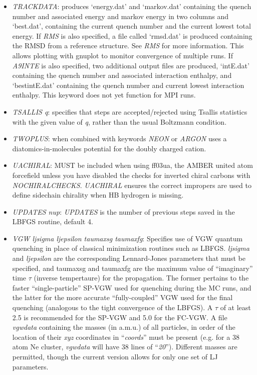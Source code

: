 \documentclass[12pt,a4paper,dvips]{article}
\begin{document}
\begin{itemize}
\item {\it TRACKDATA}: produces `energy.dat' and `markov.dat' containing the quench number and 
associated energy and markov energy in two columns and `best.dat', containing the current quench number and the current lowest
total energy. If {\it RMS\/} is also specified, a file called `rmsd.dat' is produced containing the RMSD from a reference structure.
See {\it RMS\/} for more information. This allows plotting with gnuplot to monitor convergence of multiple runs.
If {\it A9INTE} is also specified, two additional output files are produced, `intE.dat' containing the quench number and associated interaction
enthalpy, and `bestintE.dat' containing the quench number and current lowest interaction enthalpy. This keyword does not yet function for MPI runs.

\item {\it TSALLIS q\/}: specifies that steps are accepted/rejected using Tsallis statistics with the
given value of {\it q\/}, rather than the usual Boltzmann condition.

\item {\it TWOPLUS\/}: when combined with keywords {\it NEON\/} or {\it ARGON\/}
uses a diatomics-in-molecules potential for the doubly charged cation.

\item {\it UACHIRAL\/}: MUST be included when using ff03ua, the AMBER united atom forcefield unless you have disabled the checks for inverted chiral carbons
 with {\it NOCHIRALCHECKS\/}. {\it UACHIRAL\/} ensures the correct impropers are used to define sidechain chirality when HB hydrogen is missing. 

\item {\it UPDATES nup\/}: {\it UPDATES\/} is the number of previous steps saved in the LBFGS routine,
default 4.

\item {\it VGW ljsigma ljepsilon taumaxsg taumaxfg}: Specifies use of VGW quantum quenching in place of
classical minimization routines such as LBFGS. {\it ljsigma} and {\it ljepsilon} are the corresponding Lennard-Jones
parameters that must be specified, and taumaxsg and taumaxfg are the maximum value of ``imaginary'' time $\tau$ (inverse tempertaure) for the propagation.
The former pertains to the faster ``single-particle'' SP-VGW used for quenching during the MC runs, and the latter for the more accurate
``fully-coupled'' VGW used for the final quenching (analogous to the tight convergence of the LBFGS). A $\tau$ of at least
2.5 is recommended for the SP-VGW and 5.0 for the FC-VGW. A file {\it vgwdata} containing the masses (in a.m.u.) of all particles, in order of the location
of their {\it xyz} coordinates in ``{\it coords}'' must be present (e.g. for a 38 atom Ne cluster, {\it vgwdata} will have 38 lines of ``{\it 20}''). Different
masses are permitted, though the current version allows for only one set of LJ parameters. 


\end{itemize}
\end{document}
